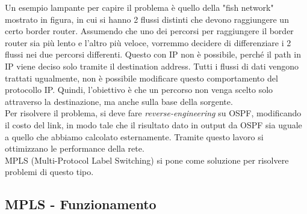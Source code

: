 \documentclass{article}
\begin{document}
Un esempio lampante per capire il problema è quello della "fish network" mostrato in figura, in cui si hanno 2 flussi distinti che devono raggiungere un certo border router. Assumendo che uno dei percorsi per raggiungere il border router sia più lento e l'altro più veloce, vorremmo decidere di differenziare i 2 flussi nei due percorsi differenti. Questo con IP non è possibile, perché il path in IP viene deciso solo tramite il destination address. Tutti i flussi di dati vengono trattati ugualmente, non è possibile modificare questo comportamento del protocollo IP. Quindi, l'obiettivo è che un percorso non venga scelto solo attraverso la destinazione, ma anche sulla base della sorgente. \\ Per risolvere il problema, si deve fare \textit{reverse-engineering} su OSPF, modificando il costo del link, in modo tale che il risultato dato in output da OSPF sia uguale a quello che abbiamo calcolato esternamente. Tramite questo lavoro si ottimizzano le performance della rete. \\ MPLS (Multi-Protocol Label Switching) si pone come soluzione per risolvere problemi di questo tipo.

\newpage
\subsection{MPLS - Funzionamento}
\end{document}
